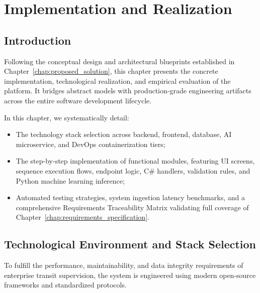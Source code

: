 \chapter{Implementation and Realization}
\label{chap:implementation}

\section{Introduction}
\label{sec:impl_intro}

Following the conceptual design and architectural blueprints established in Chapter~\ref{chap:proposed_solution}, this chapter presents the concrete implementation, technological realization, and empirical evaluation of the  platform. It bridges abstract models with production-grade engineering artifacts across the entire software development lifecycle.

In this chapter, we systematically detail:
\begin{itemize}
  \item The technology stack selection across backend, frontend, database, AI microservice, and DevOps containerization tiers;
  \item The step-by-step implementation of functional modules, featuring UI screens, sequence execution flows, endpoint logic, C\# handlers, validation rules, and Python machine learning inference;
  \item Automated testing strategies, system ingestion latency benchmarks, and a comprehensive Requirements Traceability Matrix validating full coverage of Chapter~\ref{chap:requirements_specification}.
\end{itemize}

\section{Technological Environment and Stack Selection}
\label{sec:impl_tech_stack}

To fulfill the performance, maintainability, and data integrity requirements of enterprise transit supervision, the system is engineered using modern open-source frameworks and standardized protocols.

